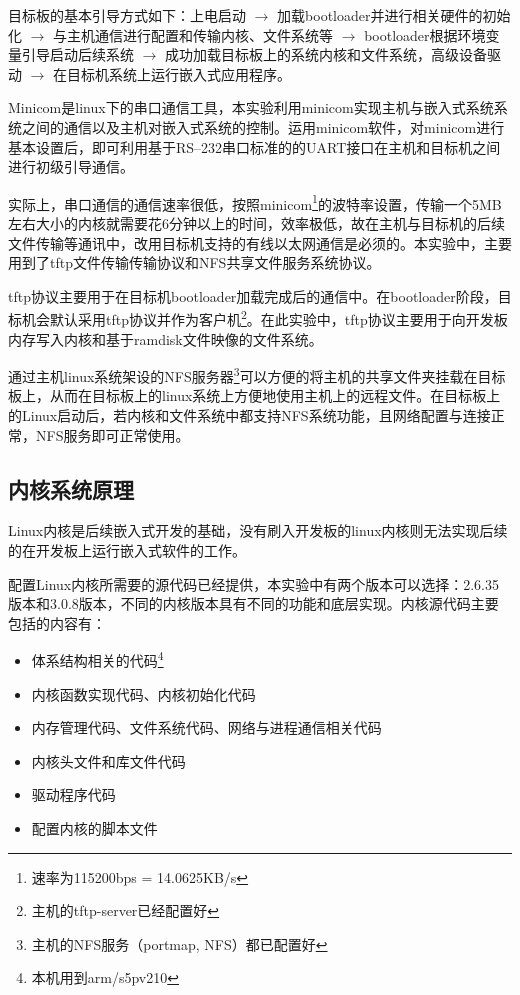 \documentclass[hyperref,UTF8]{ctexart}
\begin{document}
目标板的基本引导方式如下：上电启动 $\rightarrow$ 加载bootloader并进行相关硬件的初始化 $\rightarrow$ 与主机通信进行配置和传输内核、文件系统等 $\rightarrow$ bootloader根据环境变量引导启动后续系统 $\rightarrow$ 成功加载目标板上的系统内核和文件系统，高级设备驱动 $\rightarrow$ 在目标机系统上运行嵌入式应用程序。

Minicom是linux下的串口通信工具，本实验利用minicom实现主机与嵌入式系统系统之间的通信以及主机对嵌入式系统的控制。运用minicom软件，对minicom进行基本设置后，即可利用基于RS--232串口标准的的UART接口在主机和目标机之间进行初级引导通信。

实际上，串口通信的通信速率很低，按照minicom\footnote{速率为115200bps = 14.0625KB/s}的波特率设置，传输一个5MB左右大小的内核就需要花6分钟以上的时间，效率极低，故在主机与目标机的后续文件传输等通讯中，改用目标机支持的有线以太网通信是必须的。本实验中，主要用到了tftp文件传输传输协议和NFS共享文件服务系统协议。

tftp协议主要用于在目标机bootloader加载完成后的通信中。在bootloader阶段，目标机会默认采用tftp协议并作为客户机\footnote{主机的tftp-server已经配置好}。在此实验中，tftp协议主要用于向开发板内存写入内核和基于ramdisk文件映像的文件系统。

通过主机linux系统架设的NFS服务器\footnote{主机的NFS服务（portmap, NFS）都已配置好}可以方便的将主机的共享文件夹挂载在目标板上，从而在目标板上的linux系统上方便地使用主机上的远程文件。在目标板上的Linux启动后，若内核和文件系统中都支持NFS系统功能，且网络配置与连接正常，NFS服务即可正常使用。

\subsection{内核系统原理}\label{subsec:kern-prin}
Linux内核是后续嵌入式开发的基础，没有刷入开发板的linux内核则无法实现后续的在开发板上运行嵌入式软件的工作。

配置Linux内核所需要的源代码已经提供，本实验中有两个版本可以选择：2.6.35版本和3.0.8版本，不同的内核版本具有不同的功能和底层实现。内核源代码主要包括的内容有：
\begin{itemize}
    \item 体系结构相关的代码\footnote{本机用到arm/s5pv210}
    \item 内核函数实现代码、内核初始化代码
    \item 内存管理代码、文件系统代码、网络与进程通信相关代码
    \item 内核头文件和库文件代码
    \item 驱动程序代码
    \item 配置内核的脚本文件
\end{itemize}
\end{document}
